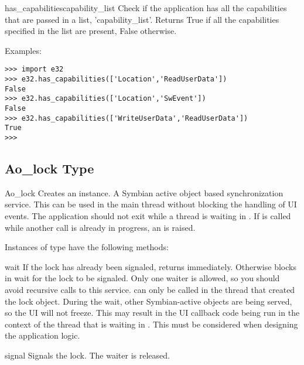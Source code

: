 \begin{funcdesc}{has_capabilities}{capability_list}
Check if the application has all the capabilities that are passed in a list, 
'capability_list'. Returns True if all the capabilities specified in the list are 
present, False otherwise.

Examples:

\begin{verbatim}
>>> import e32
>>> e32.has_capabilities(['Location','ReadUserData'])
False
>>> e32.has_capabilities(['Location','SwEvent'])
False
>>> e32.has_capabilities(['WriteUserData','ReadUserData'])
True
>>>
\end{verbatim}
\end{funcdesc}

\subsection{Ao\_lock Type}
\label{subsec:Aolock}

\begin{classdesc}{Ao_lock}{}
Creates an  instance. A Symbian active object based 
synchronization service. This can be used in the main thread without 
blocking the handling of UI events. The application should not exit while a 
thread is waiting in . If  is called 
while another  call is already in progress, an  is raised.
\end{classdesc}

Instances of  type have the following methods:

\begin{methoddesc}[Ao_lock]{wait}{}
If the lock has already been signaled, returns immediately. Otherwise blocks 
in wait for the lock to be signaled. Only one waiter is allowed, so you 
should avoid recursive calls to this service.  can only be 
called in the thread that created the lock object. During the wait, other 
Symbian-active objects are being served, so the UI will not freeze. This may 
result in the UI callback code being run in the context of the thread that 
is waiting in . This must be considered when designing 
the application logic.
\end{methoddesc}

\begin{methoddesc}[Ao_lock]{signal}{}
Signals the lock. The waiter is released.
\end{methoddesc}

